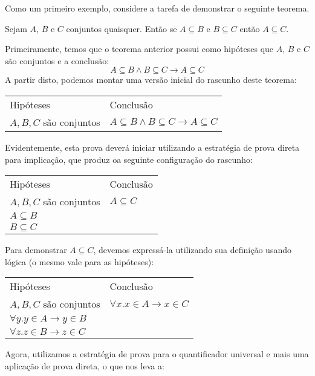 \begin{Example}
Como um primeiro exemplo, considere a tarefa de demonstrar o seguinte
teorema.
\begin{flushleft}
Sejam $A$, $B$ e $C$ conjuntos quaisquer. Então se $A\subseteq B$ e
$B\subseteq C$ então $A\subseteq C$.
\end{flushleft}
Primeiramente, temos que o teorema anterior possui como hipóteses que
$A$, $B$ e $C$ são conjuntos e a conclusão:
\[
A\subseteq B \land B \subseteq C \to A \subseteq C
\]
A partir disto, podemos montar uma versão inicial do rascunho deste
teorema:
\begin{flushleft}
  \begin{tabular}{ll}
        Hipóteses & Conclusão \\
        $A,B,C$ são conjuntos & $A\subseteq B \land B \subseteq C \to
        A \subseteq C$\\
  \end{tabular}
\end{flushleft}
Evidentemente, esta prova deverá iniciar utilizando a estratégia de
prova direta para implicação, que produz oa seguinte configuração do
rascunho:
\begin{flushleft}
  \begin{tabular}{ll}
        Hipóteses & Conclusão \\
        $A,B,C$ são conjuntos & $A \subseteq C$\\
        $A\subseteq B$ & \\
       $B \subseteq C$ & \\
  \end{tabular}
\end{flushleft}
Para demonstrar $A\subseteq C$, devemos expressá-la utilizando sua
definição usando lógica (o mesmo vale para as hipóteses):
\begin{flushleft}
  \begin{tabular}{ll}
        Hipóteses & Conclusão \\
        $A,B,C$ são conjuntos & $\forall x. x\in A \to x \in C$\\
        $\forall y. y\in A \to y \in B$ & \\
       $\forall z. z \in B \to z \in C$ & \\
  \end{tabular}
\end{flushleft}
Agora, utilizamos a estratégia de prova para o quantificador universal
e mais uma aplicação de prova direta, o que nos leva a:
\begin{flushleft}

\end{flushleft}
\end{Example}
